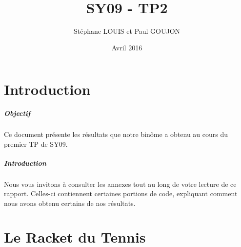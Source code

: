 \documentclass{report}
\begin{document}

\title{SY09 - TP2}
\date{Avril 2016}
\author{Stéphane LOUIS et Paul GOUJON}
\maketitle

\newpage
\tableofcontents{}

\newpage
\chapter{Introduction}
\paragraph{Objectif}
Ce document présente les résultats que notre binôme a obtenu au cours du premier TP de SY09.


\paragraph{Introduction}
Nous vous invitons à consulter les annexes tout au long de votre lecture de ce rapport. Celles-ci contiennent certaines portions de code, expliquant comment nous avons obtenu certains de nos résultats.

\newpage
{}
\chapter{Le Racket du Tennis}
\end{document}
